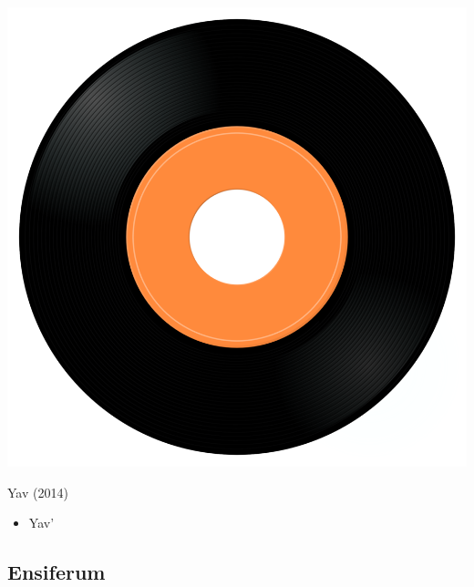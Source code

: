 \begin{minipage}[t]{0.25\textwidth}
\captionsetup{type=figure}
\includegraphics[width=\textwidth]{Images/cover.png}
\caption*{Yav (2014)}
\end{minipage}
\begin{minipage}[t]{0.25\textwidth}\vspace{0pt}
\begin{itemize}[nosep,leftmargin=1em,labelwidth=*,align=left]
	\setlength{\itemsep}{0pt}
	\item Yav'
\end{itemize}
\end{minipage}

\subsection{Ensiferum}


